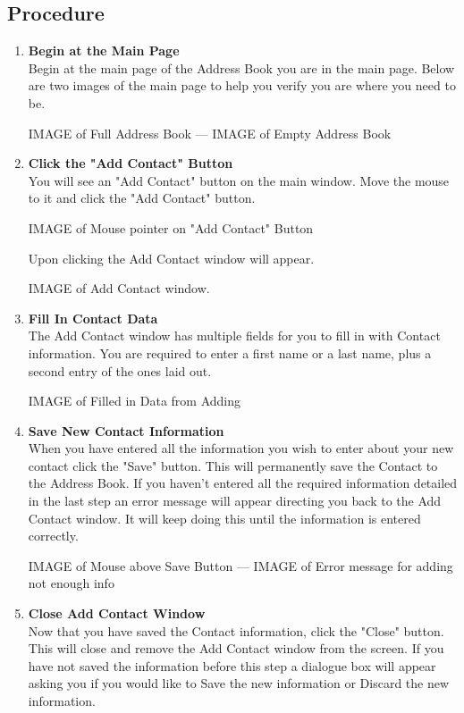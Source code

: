\documentclass[a4paper, 11pt]{article}
\begin{document}
\subsection{Procedure}
\begin{enumerate}[label=\textbf{\arabic*})]
    \item{\textbf{Begin at the Main Page}}\\ Begin at the main page of the Address Book you are in the main page. Below are two images of the main page to help you verify you are where you need to be.
    
    IMAGE of Full Address Book --- IMAGE of Empty Address Book
    
    \item{\textbf{Click the "Add Contact" Button}}\\ You will see an "Add Contact" button on the main window. Move the mouse to it and click the "Add Contact" button. 
    
    IMAGE of Mouse pointer on "Add Contact" Button
    
    Upon clicking the Add Contact window will appear.
    
    IMAGE of Add Contact window.
    
    \item{\textbf{Fill In Contact Data}}\\ The Add Contact window has multiple fields for you to fill in with Contact information. You are required to enter a first name or a last name, plus a second entry of the ones laid out.
    
    IMAGE of Filled in Data from Adding 
    
    \item{\textbf{Save New Contact Information}}\\ When you have entered all the information you wish to enter about your new contact click the "Save" button. This will permanently save the Contact to the Address Book. If you haven't entered all the required information detailed in the last step an error message will appear directing you back to the Add Contact window. It will keep doing this until the information is entered correctly.
    
    IMAGE of Mouse above Save Button --- IMAGE of Error message for adding not enough info
    
    \item{\textbf{Close Add Contact Window}}\\ Now that you have saved the Contact information, click the "Close" button. This will close and remove the Add Contact window from the screen. If you have not saved the information before this step a dialogue box will appear asking you if you would like to Save the new information or Discard the new information.
    

\end{enumerate}
\end{document}
